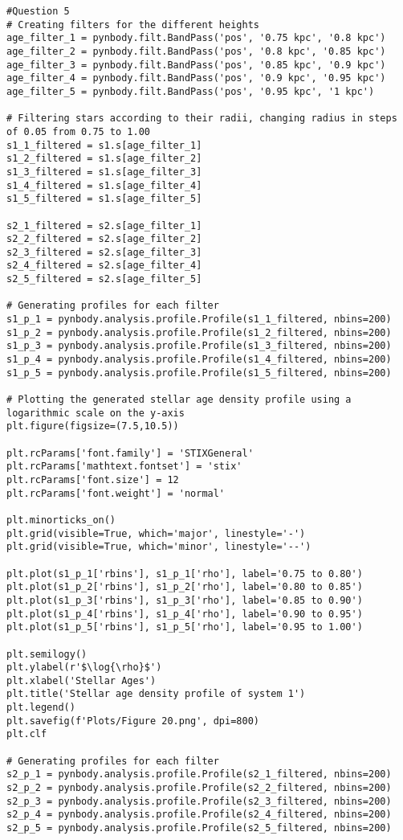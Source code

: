 \documentclass[12pt, a4paper]{article}
\begin{document}
\begin{lstlisting}[language=iPython]
#Question 5
# Creating filters for the different heights
age_filter_1 = pynbody.filt.BandPass('pos', '0.75 kpc', '0.8 kpc')
age_filter_2 = pynbody.filt.BandPass('pos', '0.8 kpc', '0.85 kpc')
age_filter_3 = pynbody.filt.BandPass('pos', '0.85 kpc', '0.9 kpc')
age_filter_4 = pynbody.filt.BandPass('pos', '0.9 kpc', '0.95 kpc')
age_filter_5 = pynbody.filt.BandPass('pos', '0.95 kpc', '1 kpc')
  
# Filtering stars according to their radii, changing radius in steps of 0.05 from 0.75 to 1.00
s1_1_filtered = s1.s[age_filter_1]
s1_2_filtered = s1.s[age_filter_2]
s1_3_filtered = s1.s[age_filter_3]
s1_4_filtered = s1.s[age_filter_4]
s1_5_filtered = s1.s[age_filter_5]
  
s2_1_filtered = s2.s[age_filter_1]
s2_2_filtered = s2.s[age_filter_2]
s2_3_filtered = s2.s[age_filter_3]
s2_4_filtered = s2.s[age_filter_4]
s2_5_filtered = s2.s[age_filter_5]
  
# Generating profiles for each filter
s1_p_1 = pynbody.analysis.profile.Profile(s1_1_filtered, nbins=200)
s1_p_2 = pynbody.analysis.profile.Profile(s1_2_filtered, nbins=200)
s1_p_3 = pynbody.analysis.profile.Profile(s1_3_filtered, nbins=200)
s1_p_4 = pynbody.analysis.profile.Profile(s1_4_filtered, nbins=200)
s1_p_5 = pynbody.analysis.profile.Profile(s1_5_filtered, nbins=200)
  
# Plotting the generated stellar age density profile using a logarithmic scale on the y-axis
plt.figure(figsize=(7.5,10.5))
  
plt.rcParams['font.family'] = 'STIXGeneral'
plt.rcParams['mathtext.fontset'] = 'stix'
plt.rcParams['font.size'] = 12
plt.rcParams['font.weight'] = 'normal'
  
plt.minorticks_on()
plt.grid(visible=True, which='major', linestyle='-')
plt.grid(visible=True, which='minor', linestyle='--')
  
plt.plot(s1_p_1['rbins'], s1_p_1['rho'], label='0.75 to 0.80')
plt.plot(s1_p_2['rbins'], s1_p_2['rho'], label='0.80 to 0.85')
plt.plot(s1_p_3['rbins'], s1_p_3['rho'], label='0.85 to 0.90')
plt.plot(s1_p_4['rbins'], s1_p_4['rho'], label='0.90 to 0.95')
plt.plot(s1_p_5['rbins'], s1_p_5['rho'], label='0.95 to 1.00')
  
plt.semilogy()
plt.ylabel(r'$\log{\rho}$')
plt.xlabel('Stellar Ages')
plt.title('Stellar age density profile of system 1')
plt.legend()
plt.savefig(f'Plots/Figure 20.png', dpi=800)
plt.clf
  
# Generating profiles for each filter
s2_p_1 = pynbody.analysis.profile.Profile(s2_1_filtered, nbins=200)
s2_p_2 = pynbody.analysis.profile.Profile(s2_2_filtered, nbins=200)
s2_p_3 = pynbody.analysis.profile.Profile(s2_3_filtered, nbins=200)
s2_p_4 = pynbody.analysis.profile.Profile(s2_4_filtered, nbins=200)
s2_p_5 = pynbody.analysis.profile.Profile(s2_5_filtered, nbins=200)
  

\end{lstlisting}
\end{document}
